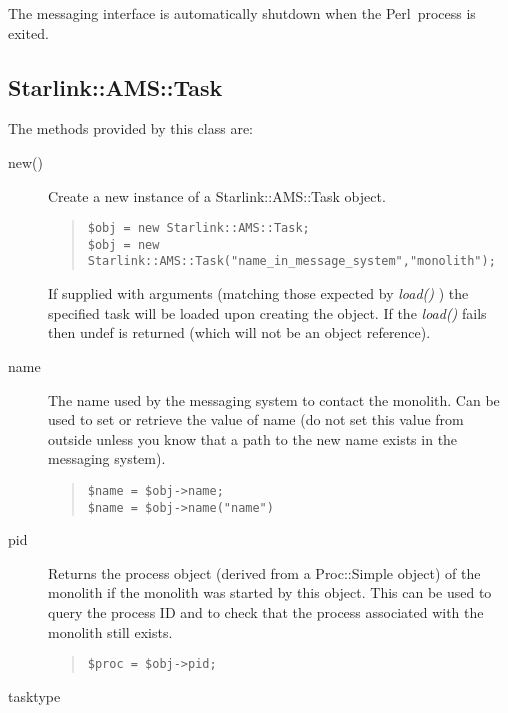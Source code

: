 \documentclass[twoside,11pt]{article}
\newenvironment{myquote}{\begin{quote}\begin{small}}{\end{small}\end{quote}}
\newcommand{\perl}{\xref{\textsf{Perl}}{sun193}{}}
\newcommand{\xref}[3]{#1}
\renewcommand{\_}{\texttt{\symbol{95}}}
\begin{document}
The messaging interface is automatically shutdown when the \perl\ process is
exited. 

\subsection{Starlink::AMS::Task}

The methods provided by this class are:

\begin{description}

\item[new()] \mbox{}

Create a new instance of a Starlink::AMS::Task object.
\begin{myquote}
\begin{verbatim}
$obj = new Starlink::AMS::Task;
$obj = new Starlink::AMS::Task("name_in_message_system","monolith");
\end{verbatim}
\end{myquote}

If supplied with arguments (matching those expected by {\em load()\/} ) the
specified task will be loaded upon creating the object. If the {\em load()\/}
fails then undef is returned (which will not be an object reference).

\item[name] \mbox{}

The name used by the messaging system to contact the monolith.
Can be used to set or retrieve the value of name (do not set
this value from outside unless you know that a path to the 
new name exists in the messaging system).
\begin{myquote}
\begin{verbatim}
$name = $obj->name;
$name = $obj->name("name")
\end{verbatim}
\end{myquote}

\item[pid] \mbox{}

Returns the process object (derived from a Proc::Simple object)
of the monolith if the monolith was started by this object.
This can be used to query the process ID and to check that
the process associated with the monolith still exists.
\begin{myquote}
\begin{verbatim}
$proc = $obj->pid;
\end{verbatim}
\end{myquote}

\item[tasktype] \mbox{}


\end{description}
\end{document}
